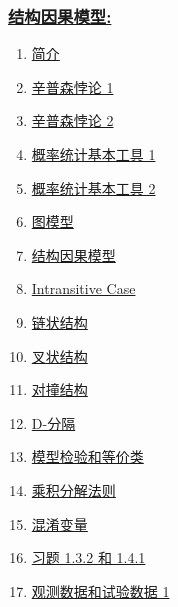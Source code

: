 \documentclass[11pt]{article}
\begin{document}
\subsubsection*{\href{https://space.bilibili.com/491707363/lists/25679?type=season}{\kaishu 结构因果模型:}}

\vspace{-0.5cm}

\begin{multicols}{3}
	\begin{enumerate}
		\item \href{https://mp.weixin.qq.com/s/qroVyHDwNjOEkoLWPTFDwg}{简介}	%
		\item \href{https://mp.weixin.qq.com/s/d4PVqAFXsdeMN-ZWz5aATA}{辛普森悖论 1}	%
		\item \href{https://mp.weixin.qq.com/s/BbGhJG6zVFxo_xPRUMuE9A}{辛普森悖论 2}	%
		\item \href{https://mp.weixin.qq.com/s/nbCWMl-eaTzCjYqGrHSjSA}{概率统计基本工具 1}	%
		\item \href{https://mp.weixin.qq.com/s/_OALIAraHh1kLxz4WM4SDQ}{概率统计基本工具 2}	%
		\item \href{https://mp.weixin.qq.com/s/dJcCR8LJlUKa80lmB8M8eg}{图模型}	%
		\item \href{https://mp.weixin.qq.com/s/ioHaB_aSR5hzQuqjZB_VZQ}{结构因果模型}	%
		\item \href{https://mp.weixin.qq.com/s/D55qKD7w5yLKTjP7_S3wug}{Intransitive Case}	%
		\item \href{https://mp.weixin.qq.com/s/oacDo6ydqp6YERJC-_bQ0Q}{链状结构}	%
		\item \href{https://mp.weixin.qq.com/s/tTwGhY6cnCWgsM9StlBj0A}{叉状结构}	%
		\item \href{https://mp.weixin.qq.com/s/6Uw-RI8G5pmvH71kER392A}{对撞结构}	%
		\item \href{https://mp.weixin.qq.com/s/Q2Um2f-cy_D5s6nEhtFUUA}{D-分隔}	%
		\item \href{https://mp.weixin.qq.com/s/f_DPek3v2I7h2JfsXheCRw}{模型检验和等价类}	%
		\item \href{https://mp.weixin.qq.com/s/Uf2Gvs7y9u7A8STtQQHeCg}{乘积分解法则}	%
		\item \href{https://mp.weixin.qq.com/s/mvpAu4WOkg6PULIncn8MmA}{混淆变量}	%
		\item \href{https://mp.weixin.qq.com/s/EybWLdgnl4cAGdHCFHihUg}{习题 1.3.2 和 1.4.1}	%
		\item \href{https://mp.weixin.qq.com/s/8mBCmaYlAdL-AMISakK3kw}{观测数据和试验数据 1}	%

\end{enumerate}
\end{multicols}
\end{document}
